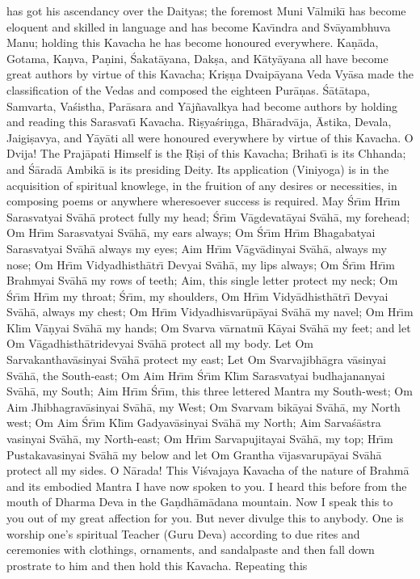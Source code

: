 has got his ascendancy over the Daityas; the foremost Muni V\=almik\={\i} has become eloquent and skilled in language and has become Kav\={\i}ndra and Sv\=ayambhuva Manu; holding this Kavacha he has become honoured everywhere. Ka\d{n}\=ada, Gotama, Ka\d{n}va, Pa\d{n}ini, \'Sakat\=ayana, Dak\d{s}a, and K\=aty\=ayana all have become great authors by virtue of this Kavacha; Kri\d{s}\d{n}a Dvaip\=ayana Veda Vy\=asa made the classification of the Vedas and composed the eighteen Pur\=a\d{n}as. \'S\=at\=atapa, Samvarta, Va\'sistha, Par\=asara and Y\=aj\~navalkya had become authors by holding and reading this Sarasvat\={\i} Kavacha. Ri\d{s}ya\'sri\d{n}ga, Bh\=aradv\=aja, \=Astika, Devala, Jaigi\d{s}avya, and Y\=ay\=ati all were honoured everywhere by virtue of this Kavacha. O Dvija! The Praj\=apati Himself is the \d{R}i\d{s}i of this Kavacha; Brihat\={\i} is its Chhanda; and \'S\=arad\=a Ambik\=a is its presiding Deity. Its application (Viniyoga) is in the acquisition of spiritual knowlege, in the fruition of any desires or necessities, in composing poems or anywhere wheresoever success is required. May \'Sr\={\i}m Hr\={\i}m Sarasvatyai Sv\=ah\=a protect fully my head; \'Sr\={\i}m V\=agdevat\=ayai Sv\=ah\=a, my forehead; Om Hr\={\i}m Sarasvatyai Sv\=ah\=a, my ears always; Om \'Sr\={\i}m Hr\={\i}m Bhagabatyai Sarasvatyai Sv\=ah\=a always my eyes; Aim Hr\={\i}m V\=agv\=adinyai Sv\=ah\=a, always my nose; Om Hr\={\i}m Vidyadhisth\=atr\={\i} Devyai Sv\=ah\=a, my lips always; Om \'Sr\={\i}m Hr\={\i}m Brahmyai Sv\=ah\=a my rows of teeth; Aim, this single letter protect my neck; Om \'Sr\={\i}m Hr\={\i}m my throat; \'Sr\={\i}m, my shoulders, Om Hr\={\i}m Vidy\=adhisth\=atr\={\i} Devyai Sv\=ah\=a, always my chest; Om Hr\={\i}m Vidyadhisvar\=up\=ayai Sv\=ah\=a my navel; Om Hr\={\i}m Kl\={\i}m V\=a\d{n}yai Sv\=ah\=a my hands; Om Svarva v\=arnatm\={\i} K\=ayai Sv\=ah\=a my feet; and let Om V\=agadhisth\=atridevyai Sv\=ah\=a protect all my body. Let Om Sarvakanthav\=asinyai Sv\=ah\=a protect my east; Let Om Svarvajibh\=agra v\=asinyai Sv\=ah\=a, the South-east; Om Aim Hr\={\i}m \'Sr\={\i}m Kl\={\i}m Sarasvatyai budhajananyai Sv\=ah\=a, my South; Aim Hr\={\i}m \'Sr\={\i}m, this three lettered Mantra my South-west; Om Aim Jhibhagrav\=asinyai Sv\=ah\=a, my West; Om Svarvam bik\=ayai Sv\=ah\=a, my North west; Om Aim \'Sr\={\i}m Kl\={\i}m Gadyav\=asinyai Sv\=ah\=a my North; Aim Sarva\'s\=astra vasinyai Sv\=ah\=a, my North-east; Om Hr\={\i}m Sarvapujitayai Sv\=ah\=a, my top; Hr\={\i}m Pustakavasinyai Sv\=ah\=a my below and let Om Grantha v\={\i}jasvarup\=ayai Sv\=ah\=a protect all my sides. O N\=arada! This Vi\'svajaya Kavacha of the nature of Brahm\=a and its embodied Mantra I have now spoken to you. I heard this before from the mouth of Dharma Deva in the Ga\d{n}dh\=am\=adana mountain. Now I speak this to you out of my great affection for you. But never divulge this to anybody. One is worship one's spiritual Teacher (Guru Deva) according to due rites and ceremonies with clothings, ornaments, and sandalpaste and then fall down prostrate to him and then hold this Kavacha. Repeating this

